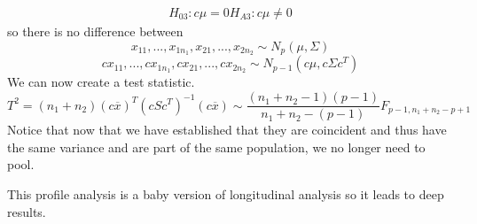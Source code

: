 \begin{gather*}
    H_{03}: c\mu = 0
    H_{A3}: c\mu\neq 0
\end{gather*}
so there is no difference between 
\[x_{11},...,x_{1n_1},x_{21},...,x_{2n_2}\sim N_p(\mu,\Sigma)\]
\[cx_{11},...,cx_{1n_1},cx_{21},...,cx_{2n_2}\sim N_{p-1}(c\mu,c\Sigma c^T)\]
We can now create a test statistic.
\[T^2 = (n_1+n_2)(c\overline{x})^T(cSc^T)^{-1}(c\overline{x})\sim 
\frac{(n_1+n_2-1)(p-1)}{n_1+n_2-(p-1)}
F_{p-1,n_1+n_2-p+1}
\]
Notice that now that we have established that they are coincident and thus have the same variance and are part of the same population, we no longer need to pool.

This profile analysis is a baby version of longitudinal analysis so it leads to deep results.
